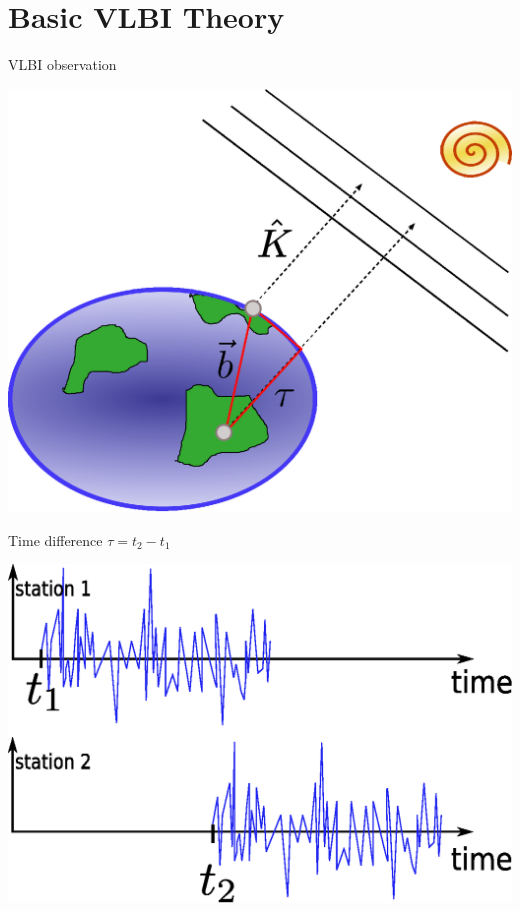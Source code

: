 \documentclass[14pt,table,t, c]{beamer}
\begin{document}
\part{Basic VLBI Theory}

\begin{frame}{VLBI observation}
\begin{center}
	\includegraphics[height=0.8\textheight]{figure/vlbi_concept2}
\end{center}
\end{frame}


\begin{frame}{Time difference $\tau = t_2 - t_1$}
\begin{centering}
    \hfill\includegraphics[width=0.9\linewidth]{figure/corr}\hspace*{\fill}
\end{centering}
\end{frame}
\end{document}
